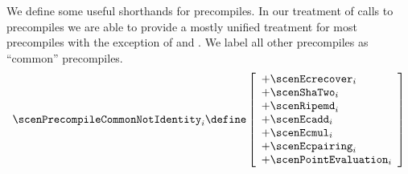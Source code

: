 We define some useful shorthands for precompiles.
In our treatment of calls to precompiles we are able to provide a mostly unified treatment for most precompiles with the exception of  and .
We label all other precompiles as ``common'' precompiles.
\[
	\scenPrecompileCommonNotIdentity _{i}
	\define
	\left[ \begin{array}{l}
		+ \scenEcrecover _{i} \\
		+ \scenShaTwo    _{i} \\
		+ \scenRipemd    _{i} \\
		+ \scenEcadd     _{i} \\
		+ \scenEcmul     _{i} \\
		+ \scenEcpairing _{i} \\
		+ \scenPointEvaluation _{i} \\
	\end{array} \right]
\]
